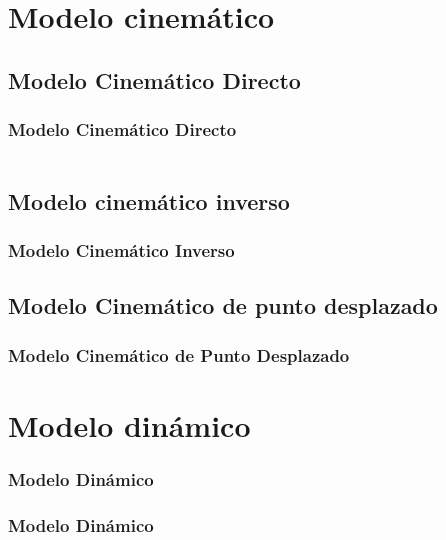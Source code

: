 \documentclass{beamer}
\begin{document}
\section{Modelo cinemático}
\subsection{Modelo Cinemático Directo}
\begin{frame}
	\frametitle{Modelo Cinemático Directo}
	\begin{columns}[c] %
		
	\end{columns}
\end{frame}

\subsection{Modelo cinemático inverso}

\begin{frame}
\frametitle{Modelo Cinemático Inverso}
		
\end{frame}

\subsection{Modelo Cinemático de punto desplazado}
\begin{frame}
\frametitle{Modelo Cinemático de Punto Desplazado}

\end{frame}


\section{Modelo dinámico}
\begin{frame}
\frametitle{Modelo Dinámico}

\end{frame}

\begin{frame}
\frametitle{Modelo Dinámico}

\end{frame}
\end{document}
